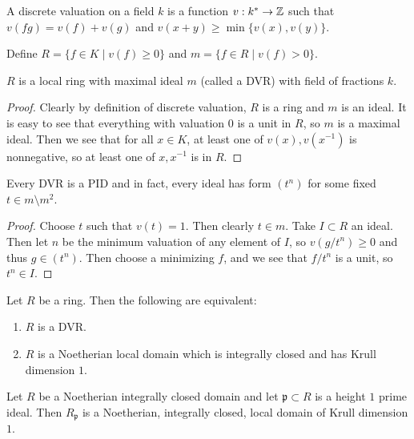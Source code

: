 \documentclass[twoside, 10pt]{article}
\begin{document}
        \begin{defn} A discrete valuation on a field $k$ is
            a function $v: k^* \to \mathbb{Z}$ such that $v(fg) = v(f)+v(g)$ and
            $v(x+y) \geq \min\{v(x),v(y)\}$.

            Define $R = \{f \in K \mid v(f) \geq 0 \}$ and $m = \{ f \in R \mid
        v(f) > 0 \}$.  \end{defn}

        \begin{lem} $R$ is a local ring with maximal ideal $m$ (called a DVR)
            with field of fractions $k$.  \begin{proof} Clearly by definition
                of discrete valuation, $R$ is a ring and $m$ is an ideal. It is
                easy to see that everything with valuation $0$ is a unit in
            $R$, so $m$ is a maximal ideal. Then we see that for all $x \in K$,
        at least one of $v(x),v(x^{-1})$ is nonnegative, so at least one of
    $x,x^{-1}$ is in $R$.  \end{proof} \end{lem}

        \begin{lem} Every DVR is a PID and in fact, every ideal has form
            $(t^n)$ for some fixed $t \in m \setminus m^2$.  \begin{proof}
                Choose $t$ such that $v(t) = 1$. Then clearly $t \in m$. Take
                $I \subset R$ an ideal. Then let $n$ be the minimum valuation
            of any element of $I$, so $v(g/t^n) \geq 0$ and thus $g \in (t^n)$.
        Then choose a minimizing $f$, and we see that $f/t^n$ is a unit, so
    $t^n \in I$.  \end{proof} \end{lem}

        \begin{thm} Let $R$ be a ring. Then the following are equivalent:
        \begin{enumerate} \item $R$ is a DVR.  \item $R$ is a Noetherian local
        domain which is integrally closed and has Krull dimension $1$.
\end{enumerate} \end{thm}

        \begin{cor} Let $R$ be a Noetherian integrally closed domain and let
        $\mathfrak{p} \subset R$ is a height $1$ prime ideal. Then
    $R_{\mathfrak{p}}$ is a Noetherian, integrally closed, local domain of
Krull dimension $1$.  \end{cor}
\end{document}
